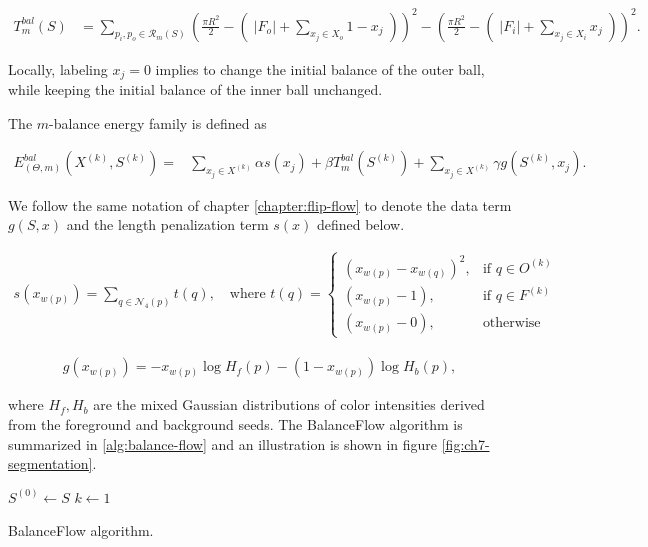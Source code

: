 \begin{align}
	T_{m}^{bal}(S) &= \sum_{p_i,p_o \in \mathcal{R}_m(S)}{( \frac{\pi R^2}{2} - (\; |F_o| + \sum_{ x_j \in X_o}{1-x_j} \; ) )^2 -(\frac{\pi R^2}{2} - (\; |F_i| + \sum_{x_j \in X_i}{x_j}\;))^2}.
	\label{eq:balance-term}
\end{align}

Locally, labeling $x_j=0$ implies to change the initial balance of the outer ball, while keeping the initial balance of the inner ball unchanged. 

The $m$-balance energy family is defined as

\begin{align}
  E_{(\Theta,m)}^{bal}(X^{(k)},S^{(k)}) =& \sum_{x_j \in X^{(k)}}{\alpha s(x_j)} + \beta T_{m}^{bal}(S^{(k)}) + \sum_{x_j \in X^{(k)}}{\gamma g(S^{(k)},x_j)}.
  \label{eq:single-step-energy-family}
\end{align}

We follow the same notation of chapter \ref{chapter:flip-flow} to denote the data term $g(S,x)$ and the length penalization term $s(x)$ defined below. 

\begin{align}
  s(x_{w(p)})=\sum_{q \in \mathcal{N}_4(p)}{ t(q) }, \quad \text{where } t(q) = \left\{\begin{array}{ll}
  (x_{w(p)}-x_{w(q)})^2, & \text{if } q \in O^{(k)}\\
  (x_{w(p)}-1), & \text{if } q \in F^{(k)}\\
  (x_{w(p)}-0), & \text{otherwise }
  \end{array}\right.
  \label{eq:single-step-length-penalization}
\end{align}

\begin{align}
  g(x_{w(p)}) = -x_{w(p)}\log{H_f(p)} - (1-x_{w(p)})\log{H_b(p)},
  \label{eq:single-step-data-fidelity}
\end{align}	

where $H_f ,H_b $ are the mixed Gaussian distributions of color intensities derived from the foreground and background seeds. The BalanceFlow algorithm is summarized in \ref{alg:balance-flow} and an illustration is shown in figure \ref{fig:ch7-segmentation}.

\begin{algorithm}
 
 \BlankLine
 $S^{(0)} \longleftarrow S$\;
 $k \longleftarrow 1$\;
 \caption{BalanceFlow algorithm.}
 \label{alg:balance-flow}  
\end{algorithm}

